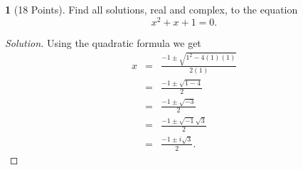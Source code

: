 \documentclass[12pt]{amsart}
\theoremstyle{definition}
\newtheorem{thm}{}
\theoremstyle{definition}
\begin{document}
\newpage
\begin{thm}[18 Points]\label{ex9}
  Find all solutions, real and complex, to the equation
  $$x^2 + x + 1 = 0.$$
  \begin{proof}[Solution]
    Using the quadratic formula we get
    \begin{eqnarray*}
      x &=& \frac{-1 \pm \sqrt{1^2 - 4(1)(1)}}{2(1)}\\
      &=& \frac{-1 \pm \sqrt{1 - 4}}{2}\\
      &=& \frac{-1 \pm \sqrt{-3}}{2}\\
      &=& \frac{-1 \pm \sqrt{-1}\sqrt{3}}{2}\\
      &=& \frac{-1 \pm i\sqrt{3}}{2}.
    \end{eqnarray*}
  \end{proof}
\end{thm}
\end{document}
